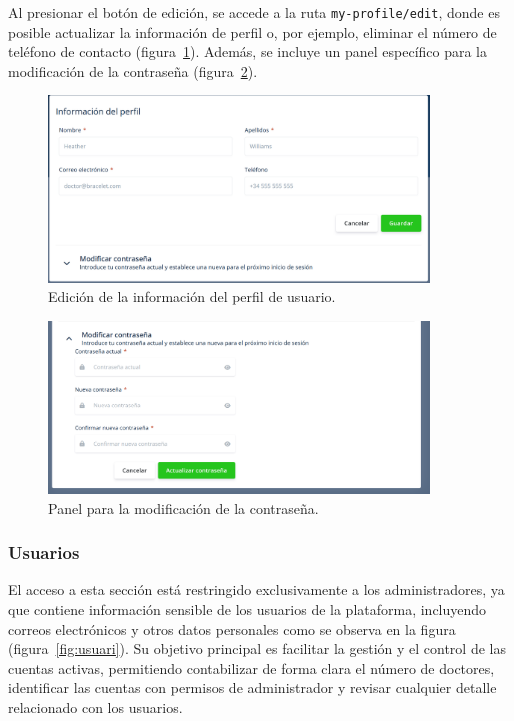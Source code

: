 \documentclass[12pt, a4paper]{article}
\begin{document}
\begin{umaappendices}
	Al presionar el botón de edición, se accede a la ruta \texttt{my-profile/edit}, donde es posible actualizar la información de perfil o, por ejemplo, eliminar el número de teléfono de contacto (figura~\ref{fig:perf}). Además, se incluye un panel específico para la modificación de la contraseña (figura~\ref{fig:perff}).
	
	\begin{figure}[htbp]
		\centering
		\includegraphics[width=0.9\textwidth]{images/13_perfil2.png}
		\caption[Ejemplo]{Edición de la información del perfil de usuario.}
		\label{fig:perf}
	\end{figure}
	
	\begin{figure}[htbp]
		\centering
		\includegraphics[width=0.9\textwidth]{images/13_perfil3.png}
		\caption[Ejemplo]{Panel para la modificación de la contraseña.}
		\label{fig:perff}
	\end{figure}
	\vspace{-15pt}
\subsubsection{Usuarios}
El acceso a esta sección está restringido exclusivamente a los administradores, ya que contiene información sensible de los usuarios de la plataforma, incluyendo correos electrónicos y otros datos personales como se observa en la figura (figura~\ref{fig:usuari}). Su objetivo principal es facilitar la gestión y el control de las cuentas activas, permitiendo contabilizar de forma clara el número de doctores, identificar las cuentas con permisos de administrador y revisar cualquier detalle relacionado con los usuarios.


\end{umaappendices}
\end{document}
